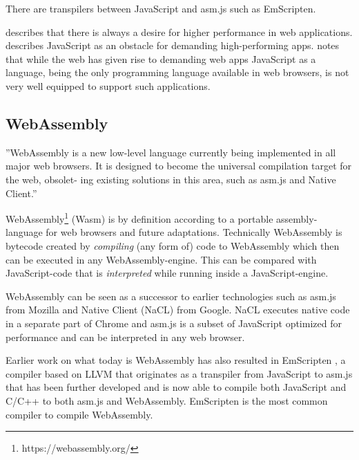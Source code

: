 There are transpilers between JavaScript and asm.js such as EmScripten.



\textcite{ReiserBlaser2017} describes that there is always a desire for higher performance in web applications.
\textcite{Zakai2018} describes JavaScript as an obstacle for demanding high-performing apps. 
\textcite{HaasRossbergSchuffTitzerHolmanGohmanWagnerZakaiBastien2017} notes that while the web has given rise to demanding web apps JavaScript as a language, being the only programming language available in web browsers, is not very well equipped to support such applications.

%

\subsection{WebAssembly}

''WebAssembly is a new low-level language currently being implemented in all major web browsers. It is designed to become the universal compilation target for the web, obsolet- ing existing solutions in this area, such as asm.js and Native Client.'' \parencite{Watt2018}

WebAssembly\footnote{https://webassembly.org/} (Wasm) is by definition according to \textcite{HaasRossbergSchuffTitzerHolmanGohmanWagnerZakaiBastien2017} a portable assembly-language for web browsers and future adaptations. Technically WebAssembly is bytecode created by \emph{compiling} (any form of) code to WebAssembly \parencite{Watt2018} which then can be executed in any WebAssembly-engine. This can be compared with JavaScript-code that is \emph{interpreted} while running inside a JavaScript-engine.

WebAssembly can be seen as a successor to earlier technologies such as asm.js from Mozilla and Native Client (NaCL) from Google. NaCL executes native code in a separate part of Chrome and asm.js  \parencite{Zakai2018} is a subset of JavaScript optimized for performance \parencite{VanEsNicolayStievenartDHondtDeRoover2016} and can be interpreted in any web browser.

Earlier work on what today is WebAssembly has also resulted in EmScripten \parencite{Zakai2011}, a compiler based on LLVM \parencite{LattnerAdve2014} that originates as a transpiler from JavaScript to asm.js \parencite{Zakai2011} that has been further developed \parencite{HaasRossbergSchuffTitzerHolmanGohmanWagnerZakaiBastien2017} and is now able to compile both JavaScript and C/C++ to both asm.js and WebAssembly. EmScripten is the most common compiler to compile WebAssembly.

